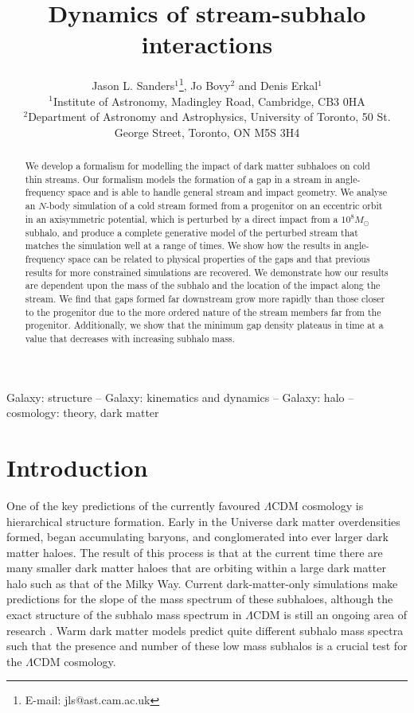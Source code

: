 \documentclass[useAMS,usenatbib,fleqn,a4paper]{mn2e}
\title{Dynamics of stream-subhalo interactions}
\author[J. L. Sanders, J. Bovy and D. Erkal]{Jason L. Sanders$^1$\thanks{E-mail: jls@ast.cam.ac.uk}, Jo Bovy$^2$ and Denis Erkal$^1$\\
$^1$Institute of Astronomy, Madingley Road, Cambridge, CB3 0HA\\
$^2$Department of Astronomy and Astrophysics, University of Toronto, 50 St. George Street, Toronto, ON M5S 3H4}
\begin{document}
\maketitle
\label{firstpage}
\begin{abstract}
We develop a formalism for modelling the impact of dark matter subhaloes on cold thin streams. Our formalism models the formation of a gap in a stream in angle-frequency space and is able to handle general stream and impact geometry. We analyse an $N$-body simulation of a cold stream formed from a progenitor on an eccentric orbit in an axisymmetric potential, which is perturbed by a direct impact from a $10^8 M_\odot$ subhalo, and produce a complete generative model of the perturbed stream that matches the simulation well at a range of times. We show how the results in angle-frequency space can be related to physical properties of the gaps and that previous results for more constrained simulations are recovered. We demonstrate how our results are dependent upon the mass of the subhalo and the location of the impact along the stream. We find that gaps formed far downstream grow more rapidly than those closer to the progenitor due to the more ordered nature of the stream members far from the progenitor. Additionally, we show that the minimum gap density plateaus in time at a value that decreases with increasing subhalo mass.
\end{abstract}

\begin{keywords}
Galaxy: structure -- Galaxy: kinematics and dynamics -- Galaxy: halo -- cosmology: theory, dark matter
\end{keywords}

\section{Introduction}

One of the key predictions of the currently favoured $\Lambda$CDM cosmology is hierarchical structure formation. Early in the Universe dark matter overdensities formed, began accumulating baryons, and conglomerated into ever larger dark matter haloes. The result of this process is that at the current time there are many smaller dark matter haloes that are orbiting within a large dark matter halo such as that of the Milky Way. Current dark-matter-only simulations \citep[e.g.][]{Diemand2008,Springel2008} make predictions for the slope of the mass spectrum of these subhaloes, although the exact structure of the subhalo mass spectrum in $\Lambda$CDM is still an ongoing area of research \citep[e.g.][]{Giocoli2010,Gao2011}. Warm dark matter models predict quite different subhalo mass spectra \citep{Lovell2014} such that the presence and number of these low mass subhalos is a crucial test for the $\Lambda$CDM cosmology.
\end{document}
